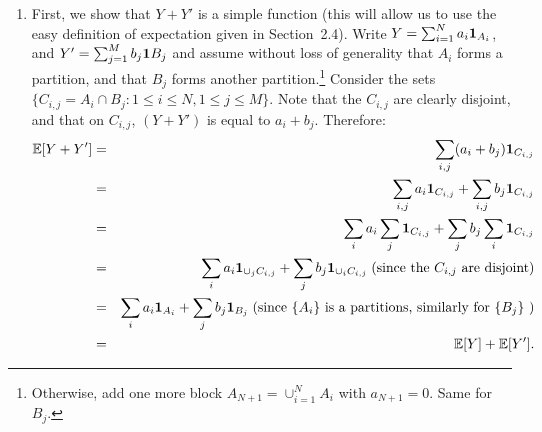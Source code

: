 \documentclass{article}
\begin{document}
\begin{enumerate}
  \item First, we show that $Y + Y'$ is a simple function (this will allow us to use the easy definition of expectation given in Section~2.4). Write $Y = \sum_{i=1}^N a_i {\mathbf 1}_{A_i}$, and $Y' = \sum_{j=1}^M b_j {\mathbf 1}{B_j}$ and assume without loss of generality that $A_i$ forms a partition, and that $B_j$ forms another partition.\footnote{Otherwise, add one more block $A_{N+1} = \cup_{i=1}^N A_i$ with $a_{N+1} = 0$. Same for $B_j$.} Consider the sets $\{C_{i,j} = A_i \cap B_j : 1\le i \le N, 1\le j \le M\}$. Note that the $C_{i,j}$ are clearly disjoint, and that on $C_{i,j}$, $(Y + Y')$ is equal to $a_i + b_j$. Therefore:
\begin{eqnarray*}
{\mathbb E}[Y + Y'] &=& \sum_{i,j} (a_i + b_j) {\mathbf 1}_{C_{i,j}} \\
&=& \sum_{i,j} a_i {\mathbf 1}_{C_{i,j}} + \sum_{i,j} b_j {\mathbf 1}_{C_{i,j}} \\
&=& \sum_{i} a_i \sum_j {\mathbf 1}_{C_{i,j}} + \sum_{j} b_j \sum_i {\mathbf 1}_{C_{i,j}} \\
&=& \sum_{i} a_i  {\mathbf 1}_{\cup_j C_{i,j}} + \sum_{j} b_j  {\mathbf 1}_{\cup_i C_{i,j}} \;\text{(since the }C_{i,j}\text{ are disjoint)} \\
&=& \sum_{i} a_i  {\mathbf 1}_{A_i} + \sum_{j} b_j  {\mathbf 1}_{B_j} \;\text{(since }\{A_{i}\}\text{ is a partitions, similarly for }\{B_{j}\} \text{ )} \\
&=& {\mathbb E}[Y] + {\mathbb E}[Y'].
\end{eqnarray*}

\end{enumerate}
\end{document}
